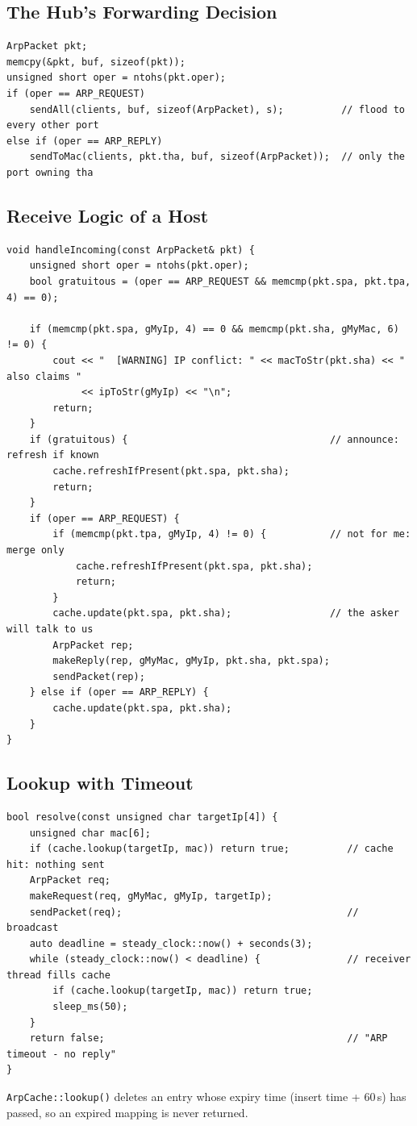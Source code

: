 \documentclass[11pt]{article}
\begin{document}
\subsection{The Hub's Forwarding Decision}
\begin{lstlisting}
ArpPacket pkt;
memcpy(&pkt, buf, sizeof(pkt));
unsigned short oper = ntohs(pkt.oper);
if (oper == ARP_REQUEST)
    sendAll(clients, buf, sizeof(ArpPacket), s);          // flood to every other port
else if (oper == ARP_REPLY)
    sendToMac(clients, pkt.tha, buf, sizeof(ArpPacket));  // only the port owning tha
\end{lstlisting}

\subsection{Receive Logic of a Host}
\begin{lstlisting}
void handleIncoming(const ArpPacket& pkt) {
    unsigned short oper = ntohs(pkt.oper);
    bool gratuitous = (oper == ARP_REQUEST && memcmp(pkt.spa, pkt.tpa, 4) == 0);

    if (memcmp(pkt.spa, gMyIp, 4) == 0 && memcmp(pkt.sha, gMyMac, 6) != 0) {
        cout << "  [WARNING] IP conflict: " << macToStr(pkt.sha) << " also claims "
             << ipToStr(gMyIp) << "\n";
        return;
    }
    if (gratuitous) {                                   // announce: refresh if known
        cache.refreshIfPresent(pkt.spa, pkt.sha);
        return;
    }
    if (oper == ARP_REQUEST) {
        if (memcmp(pkt.tpa, gMyIp, 4) != 0) {           // not for me: merge only
            cache.refreshIfPresent(pkt.spa, pkt.sha);
            return;
        }
        cache.update(pkt.spa, pkt.sha);                 // the asker will talk to us
        ArpPacket rep;
        makeReply(rep, gMyMac, gMyIp, pkt.sha, pkt.spa);
        sendPacket(rep);
    } else if (oper == ARP_REPLY) {
        cache.update(pkt.spa, pkt.sha);
    }
}
\end{lstlisting}

\subsection{Lookup with Timeout}
\begin{lstlisting}
bool resolve(const unsigned char targetIp[4]) {
    unsigned char mac[6];
    if (cache.lookup(targetIp, mac)) return true;          // cache hit: nothing sent
    ArpPacket req;
    makeRequest(req, gMyMac, gMyIp, targetIp);
    sendPacket(req);                                       // broadcast
    auto deadline = steady_clock::now() + seconds(3);
    while (steady_clock::now() < deadline) {               // receiver thread fills cache
        if (cache.lookup(targetIp, mac)) return true;
        sleep_ms(50);
    }
    return false;                                          // "ARP timeout - no reply"
}
\end{lstlisting}
\texttt{ArpCache::lookup()} deletes an entry whose expiry time (insert time + 60\,s) has
passed, so an expired mapping is never returned.
\end{document}

